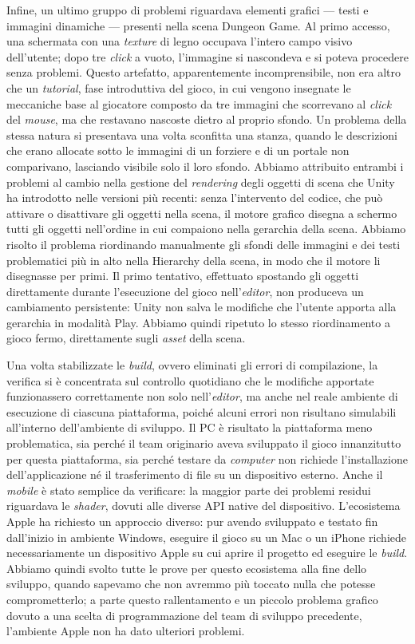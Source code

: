 Infine, un ultimo gruppo di problemi riguardava elementi grafici — testi e immagini dinamiche — presenti nella scena Dungeon Game. Al primo accesso, una schermata con una \textit{texture} di legno occupava l'intero campo visivo dell'utente; dopo tre \textit{click} a vuoto, l'immagine si nascondeva e si poteva procedere senza problemi. Questo artefatto, apparentemente incomprensibile, non era altro che un \textit{tutorial}, fase introduttiva del gioco, in cui vengono insegnate le meccaniche base al giocatore composto da tre immagini che scorrevano al \textit{click} del \textit{mouse}, ma che restavano nascoste dietro al proprio sfondo. Un problema della stessa natura si presentava una volta sconfitta una stanza, quando le descrizioni che erano allocate sotto le immagini di un forziere e di un portale non comparivano, lasciando visibile solo il loro sfondo. Abbiamo attribuito entrambi i problemi al cambio nella gestione del \textit{rendering} degli oggetti di scena che Unity ha introdotto nelle versioni più recenti: senza l'intervento del codice, che può attivare o disattivare gli oggetti nella scena, il motore grafico disegna a schermo tutti gli oggetti nell'ordine in cui compaiono nella gerarchia della scena. Abbiamo risolto il problema riordinando manualmente gli sfondi delle immagini e dei testi problematici più in alto nella Hierarchy della scena, in modo che il motore li disegnasse per primi. Il primo tentativo, effettuato spostando gli oggetti direttamente durante l'esecuzione del gioco nell'\textit{editor}, non produceva un cambiamento persistente: Unity non salva le modifiche che l'utente apporta alla gerarchia in modalità Play. Abbiamo quindi ripetuto lo stesso riordinamento a gioco fermo, direttamente sugli \textit{asset} della scena.
 
Una volta stabilizzate le \textit{build}, ovvero eliminati gli errori di compilazione, la verifica si è concentrata sul controllo quotidiano che le modifiche apportate funzionassero correttamente non solo nell'\textit{editor}, ma anche nel reale ambiente di esecuzione di ciascuna piattaforma, poiché alcuni errori non risultano simulabili all'interno dell'ambiente di sviluppo. Il PC è risultato la piattaforma meno problematica, sia perché il team originario aveva sviluppato il gioco innanzitutto per questa piattaforma, sia perché testare da \textit{computer} non richiede l'installazione dell'applicazione né il trasferimento di file su un dispositivo esterno. Anche il \textit{mobile} è stato semplice da verificare: la maggior parte dei problemi residui riguardava le \textit{shader}, dovuti alle diverse API native del dispositivo. L'ecosistema Apple ha richiesto un approccio diverso: pur avendo sviluppato e testato fin dall'inizio in ambiente Windows, eseguire il gioco su un Mac o un iPhone richiede necessariamente un dispositivo Apple su cui aprire il progetto ed eseguire le \textit{build}. Abbiamo quindi svolto tutte le prove per questo ecosistema alla fine dello sviluppo, quando sapevamo che non avremmo più toccato nulla che potesse comprometterlo; a parte questo rallentamento e un piccolo problema grafico dovuto a una scelta di programmazione del team di sviluppo precedente, l'ambiente Apple non ha dato ulteriori problemi.
 
